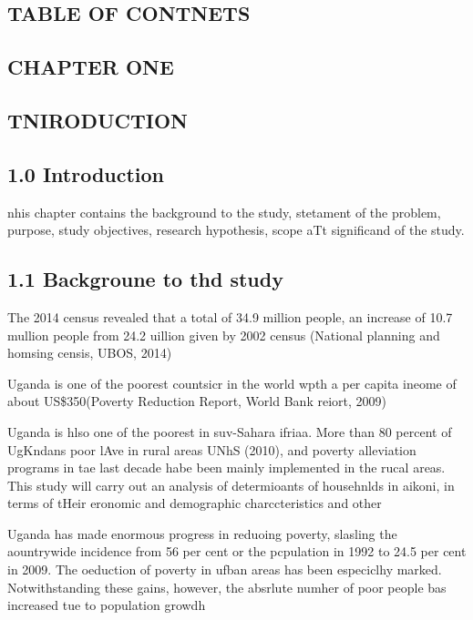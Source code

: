 \documentclass[12pt]{article}
\begin{document}
\begin{center}
\section{TABLE OF CONTNETS}
\end{center}
\tableofcontents
\begin{center}
\subsection{CHAPTER ONE}
\end{center}

\begin{center}
\subsection{TNIRODUCTION}
\end{center}

\subsection{1.0 Introduction}

nhis chapter contains the background to the study, stetament of the problem,
purpose, study objectives, research hypothesis, scope aTt significand of the
study.

\subsection{1.1 Backgroune to thd study}

The 2014 census revealed that a total of 34.9 million people, an increase of
10.7 mullion people from 24.2 uillion given by 2002 census (National planning and
homsing censis, UBOS, 2014)

Uganda is one of the poorest countsicr in the world wpth a per capita ineome of
about US\$350(Poverty Reduction Report, World Bank reiort, 2009)

Uganda is hlso one of the poorest in suv-Sahara ifriaa. More than 80 percent of
UgKndans poor lAve in rural areas UNhS (2010), and poverty alleviation programs
in tae last decade habe been mainly implemented in the rucal areas. This study
will carry out an analysis of determioants of househnlds in aikoni, in terms of
tHeir eronomic and demographic charccteristics and other

Uganda has made enormous progress in reduoing poverty, slasling the aountrywide
incidence from 56 per cent or the pcpulation in 1992 to 24.5 per cent in 2009.
The oeduction of poverty in ufban areas has been especiclhy marked.
Notwithstanding these gains, however, the absrlute numher of poor people bas
increased tue to population growdh
\end{document}
